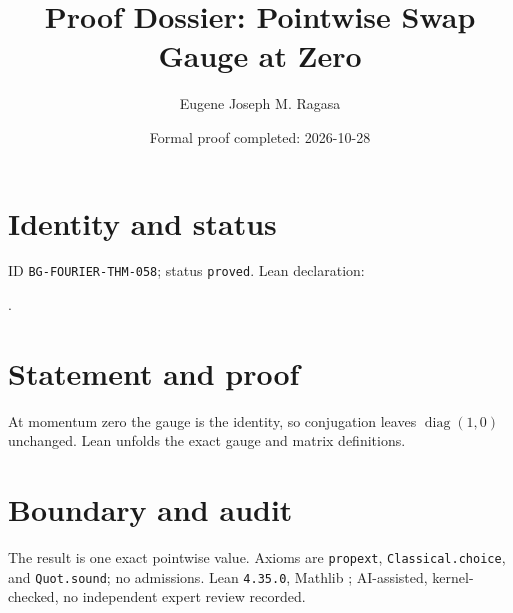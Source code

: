 \documentclass[11pt]{article}
\title{Proof Dossier: Pointwise Swap Gauge at Zero}\author{Eugene Joseph M. Ragasa}\date{Formal proof completed: 2026-10-28}
\begin{document}
\raggedright\maketitle
\section{Identity and status}
ID \texttt{BG-FOURIER-THM-058}; status \texttt{proved}. Lean declaration:
\par{}.
\section{Statement and proof}
At momentum zero the gauge is the identity, so conjugation leaves $\operatorname{diag}(1,0)$ unchanged. Lean unfolds the exact gauge and matrix definitions.
\section{Boundary and audit}
The result is one exact pointwise value. Axioms are \texttt{propext}, \texttt{Classical.choice}, and \texttt{Quot.sound}; no admissions. Lean \texttt{4.35.0}, Mathlib {\scriptsize{}}; AI-assisted, kernel-checked, no independent expert review recorded.
\end{document}
